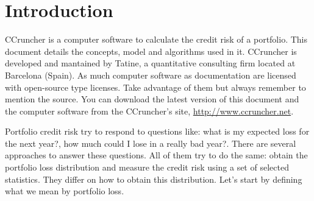 \documentclass[11pt,fleqn]{book} %
\begin{document}



\pagestyle{empty} %
\tableofcontents %
\cleardoublepage %
\pagestyle{fancy} %


\chapter{Introduction}

CCruncher is a computer software to calculate the credit risk of a portfolio. 
This document details the concepts, model and algorithms used in it.
CCruncher is developed and mantained by Tatine, %
a quantitative consulting firm located at Barcelona (Spain). As much computer 
software as documentation are licensed with open-source type licenses. Take 
advantage of them but always remember to mention the source. You can download 
the latest version of this document and the computer software from the 
CCruncher's site, \url{http://www.ccruncher.net}. 

Portfolio credit risk try to respond to questions like: what is my 
expected loss for the next year?, how much could I lose in a really 
bad year?. There are several approaches to answer these questions. 
All of them try to do the same: obtain the portfolio loss distribution
and measure the credit risk using a set of selected statistics. They 
differ on how to obtain this distribution. Let's start by defining 
what we mean by portfolio loss.
\end{document}
